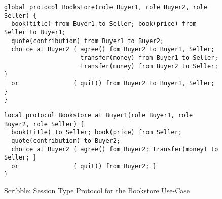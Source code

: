 \begin{figure}[t]
\begin{lstlisting}
global protocol Bookstore(role Buyer1, role Buyer2, role Seller) {
  book(title) from Buyer1 to Seller; book(price) from Seller to Buyer1;
  quote(contribution) from Buyer1 to Buyer2;
  choice at Buyer2 { agree() fom Buyer2 to Buyer1, Seller;
                     transfer(money) from Buyer1 to Seller;
                     transfer(money) from Buyer2 to Seller; }
  or               { quit() from Buyer2 to Buyer1, Seller;  }
}
\end{lstlisting}


\begin{lstlisting}
local protocol Bookstore at Buyer1(role Buyer1, role Buyer2, role Seller) {
  book(title) to Seller; book(price) from Seller;
  quote(contribution) to Buyer2;
  choice at Buyer2 { agree() fom Buyer2; transfer(money) to Seller; }
  or               { quit() from Buyer2; }
}
\end{lstlisting}
\vspace{-5mm}
\caption{Scribble: Session Type Protocol for the Bookstore Use-Case}
\label{fig:scribble_bs}
\end{figure}
